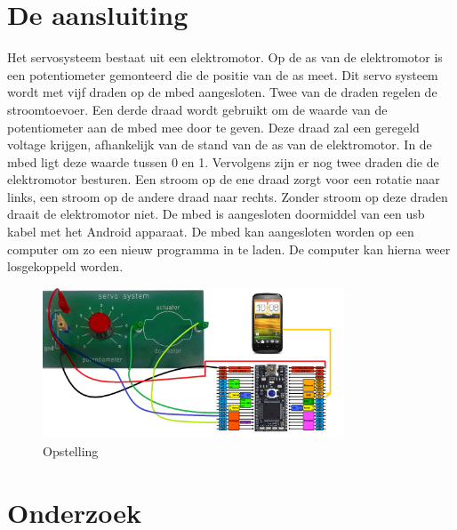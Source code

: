 \documentclass[a4paper]{article}
\begin{document}
	\section{De aansluiting}
		Het servosysteem bestaat uit een elektromotor. Op de as van de elektromotor is een potentiometer gemonteerd die de positie van de as meet. Dit servo systeem wordt met vijf draden op de mbed aangesloten. Twee van de draden regelen de stroomtoevoer. Een derde draad wordt gebruikt om de waarde van de potentiometer aan de mbed mee door te geven. Deze draad zal een geregeld voltage krijgen, afhankelijk van de stand van de as van de elektromotor. In de mbed ligt deze waarde tussen 0 en 1. Vervolgens zijn er nog twee draden die de elektromotor besturen. Een stroom op de ene draad zorgt voor een rotatie naar links, een stroom op de andere draad naar rechts. Zonder stroom op deze draden draait de elektromotor niet. De mbed is aangesloten doormiddel van een usb kabel met het Android apparaat. De mbed kan aangesloten worden op een computer om zo een nieuw programma in te laden. De computer kan hierna weer losgekoppeld worden.
	\begin{figure}[h]
		\centering
		\includegraphics[width=0.8\textwidth]{imgs/opstelling.png}
		\caption{Opstelling}
		\label{fig:opstelling}
	\end{figure}
		\newpage
	\section{Onderzoek}
\end{document}

